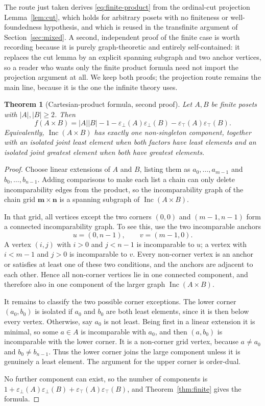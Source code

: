 \documentclass[11pt,letterpaper]{article}
\newtheorem{theorem}{Theorem}[section]
\theoremstyle{definition}
\theoremstyle{remark}
\newcommand{\Inc}{\operatorname{Inc}}
\newcommand{\epsbot}{\varepsilon_{\bot}}
\newcommand{\epstop}{\varepsilon_{\top}}
\newcommand{\chain}[1]{\mathbf{#1}}
\begin{document}
The route just taken derives \eqref{eq:finite-product} from the ordinal-cut
projection Lemma~\ref{lem:cut}, which holds for arbitrary posets with no
finiteness or well-foundedness hypothesis, and which is reused in the
transfinite argument of Section~\ref{sec:mixed}. A second, independent proof
of the finite case is worth recording because it is purely graph-theoretic
and entirely self-contained: it replaces the cut lemma by an explicit
spanning subgraph and two anchor vertices, so a reader who wants only the
finite product formula need not import the projection argument at all. We
keep both proofs; the projection route remains the main line, because it is
the one the infinite theory uses.

\begin{theorem}[Cartesian-product formula, second proof]\label{thm:cartesian}
Let $A,B$ be finite posets with $|A|,|B|\ge2$. Then
\[
 f(A\times B)=|A||B|-1-\epsbot(A)\epsbot(B)-\epstop(A)\epstop(B).
\]
Equivalently, $\Inc(A\times B)$ has exactly one non-singleton component,
together with an isolated joint least element when both factors have least
elements and an isolated joint greatest element when both have greatest
elements.
\end{theorem}
\begin{proof}
Choose linear extensions of $A$ and $B$, listing them as
$a_0,\ldots,a_{m-1}$ and $b_0,\ldots,b_{n-1}$. Adding comparisons to make
each list a chain can only delete incomparability edges from the product, so
the incomparability graph of the chain grid $\chain m\times\chain n$ is a
spanning subgraph of $\Inc(A\times B)$.

In that grid, all vertices except the two corners $(0,0)$ and $(m-1,n-1)$
form a connected incomparability graph. To see this, use the two
incomparable anchors
\[
 u=(0,n-1),\qquad v=(m-1,0).
\]
A vertex $(i,j)$ with $i>0$ and $j<n-1$ is incomparable to $u$; a vertex
with $i<m-1$ and $j>0$ is incomparable to $v$. Every non-corner vertex is an
anchor or satisfies at least one of these two conditions, and the anchors
are adjacent to each other. Hence all non-corner vertices lie in one
connected component, and therefore also in one component of the larger graph
$\Inc(A\times B)$.

It remains to classify the two possible corner exceptions. The lower corner
$(a_0,b_0)$ is isolated if $a_0$ and $b_0$ are both least elements, since it
is then below every vertex. Otherwise, say $a_0$ is not least. Being first
in a linear extension it is minimal, so some $a\in A$ is incomparable with
$a_0$, and then $(a,b_0)$ is incomparable with the lower corner. It is a
non-corner grid vertex, because $a\ne a_0$ and $b_0\ne b_{n-1}$. Thus the
lower corner joins the large component unless it is genuinely a least
element. The argument for the upper corner is order-dual.

No further component can exist, so the number of components is
$1+\epsbot(A)\epsbot(B)+\epstop(A)\epstop(B)$, and
Theorem~\ref{thm:finite} gives the formula.
\end{proof}
\end{document}
